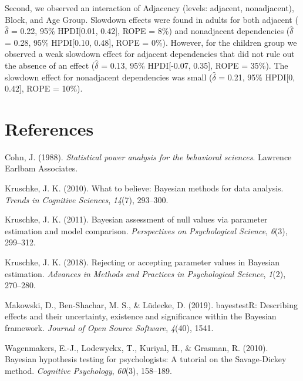 \documentclass[
  english,
  man,floatsintext]{apa7}
\newlength{\cslhangindent}
\newenvironment{cslreferences}%
  {\setlength{\parindent}{0pt}%
  \everypar{\setlength{\hangindent}{\cslhangindent}}\ignorespaces}%
  {\par}
\begin{document}
Second, we observed an interaction of Adjacency (levels: adjacent, nonadjacent), Block, and Age Group. Slowdown effects were found in adults for both adjacent (\(\hat{\delta}\) = 0.22, 95\% HPDI{[}0.01, 0.42{]}, ROPE = 8\%) and nonadjacent dependencies (\(\hat{\delta}\) = 0.28, 95\% HPDI{[}0.10, 0.48{]}, ROPE = 0\%). However, for the children group we observed a weak slowdown effect for adjacent dependencies that did not rule out the absence of an effect (\(\hat{\delta}\) = 0.13, 95\% HPDI{[}-0.07, 0.35{]}, ROPE = 35\%). The slowdown effect for nonadjacent dependencies was small (\(\hat{\delta}\) = 0.21, 95\% HPDI{[}0, 0.42{]}, ROPE = 10\%).

\newpage

\hypertarget{references}{%
\section{References}\label{references}}

\begingroup
\setlength{\parindent}{-0.5in}
\setlength{\leftskip}{0.5in}

\hypertarget{ref}{}

\endgroup

\hypertarget{refs}{}
\begin{cslreferences}
\leavevmode\hypertarget{ref-cohn1988statistical}{}%
Cohn, J. (1988). \emph{Statistical power analysis for the behavioral sciences}. Lawrence Earlbam Associates.

\leavevmode\hypertarget{ref-kruschke2010believe}{}%
Kruschke, J. K. (2010). What to believe: Bayesian methods for data analysis. \emph{Trends in Cognitive Sciences}, \emph{14}(7), 293--300.

\leavevmode\hypertarget{ref-kruschke2011bayesian}{}%
Kruschke, J. K. (2011). Bayesian assessment of null values via parameter estimation and model comparison. \emph{Perspectives on Psychological Science}, \emph{6}(3), 299--312.

\leavevmode\hypertarget{ref-kruschke2018rejecting}{}%
Kruschke, J. K. (2018). Rejecting or accepting parameter values in Bayesian estimation. \emph{Advances in Methods and Practices in Psychological Science}, \emph{1}(2), 270--280.

\leavevmode\hypertarget{ref-makowski2019bayestestr}{}%
Makowski, D., Ben-Shachar, M. S., \& Lüdecke, D. (2019). bayestestR: Describing effects and their uncertainty, existence and significance within the Bayesian framework. \emph{Journal of Open Source Software}, \emph{4}(40), 1541.

\leavevmode\hypertarget{ref-wagenmakers2010bayesian}{}%
Wagenmakers, E.-J., Lodewyckx, T., Kuriyal, H., \& Grasman, R. (2010). Bayesian hypothesis testing for psychologists: A tutorial on the Savage-Dickey method. \emph{Cognitive Psychology}, \emph{60}(3), 158--189.
\end{cslreferences}
\end{document}
